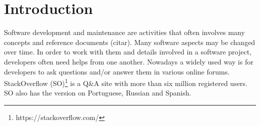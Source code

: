 \section{Introduction}

Software development and maintenance are activities that often involves many concepts and reference documents (citar). Many software aspects may be changed over time. In order to work with
them and details involved in a software project, developers often need helps from one another.  Nowadays a widely used way is for developers to ask questions and/or answer them in various online forums. StackOverflow (SO)\footnote{https://stackoverflow.com/} is a Q\&A site with more than six million registered users. SO also has the version on Portuguese, Russian and Spanish. 





